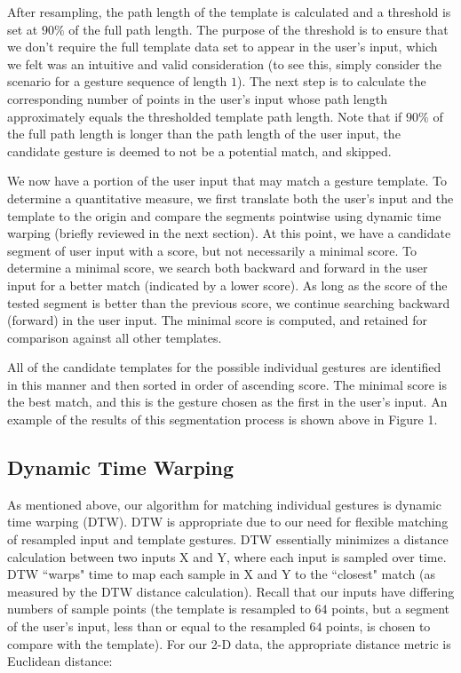 \documentclass[twoside]{article}
\begin{document}
\begin{multicols}{2}
After resampling, the path length of the template is calculated and a threshold
is set at $90\%$ of the full path length. The purpose of the threshold is to
ensure that we don't require the full template data set to appear in the user's
input, which we felt was an intuitive and valid consideration (to see this,
simply consider the scenario for a gesture sequence of length $1$). The next
step is to calculate the corresponding number of points in the user's input
whose path length approximately equals the thresholded template path length.
Note that if $90\%$ of the full path length is longer than the path length of
the user input, the candidate gesture is deemed to not be a potential match, and
skipped.

We now have a portion of the user input that may match a gesture template. To
determine a quantitative measure, we first translate both the user's input and
the template to the origin and compare the segments pointwise using dynamic time
warping (briefly reviewed in the next section).
At this point, we have a candidate segment of user input with a score, but not
necessarily a minimal score. To determine a minimal score, we search both
backward and forward in the user input for a better match (indicated by a lower
score). As long as the score of the tested segment is better than the previous
score, we continue searching backward (forward) in the user input. The minimal
score is computed, and retained for comparison against all other templates.

All of the candidate templates for the possible individual gestures are
identified in this manner and then sorted in order of ascending score. The
minimal score is the best match, and this is the gesture chosen as the first in
the user's input. An example of the results of this segmentation process is
shown above in Figure 1.

\subsection*{Dynamic Time Warping}

As mentioned above, our algorithm for matching individual gestures is dynamic time warping (DTW).
DTW is appropriate due to our need for flexible matching of resampled input and template
gestures. DTW essentially minimizes a distance calculation between two inputs X and Y,
where each input is sampled over time. DTW ``warps" time to map each sample in X and Y to
the ``closest" match (as measured by the DTW distance calculation). Recall that our inputs
have differing numbers of sample points (the template is resampled to $64$ points, but a
segment of the user's input, less than or equal to the resampled $64$ points, is chosen
to compare with the template). For our 2-D data, the appropriate distance metric is Euclidean distance:


\end{multicols}
\end{document}
